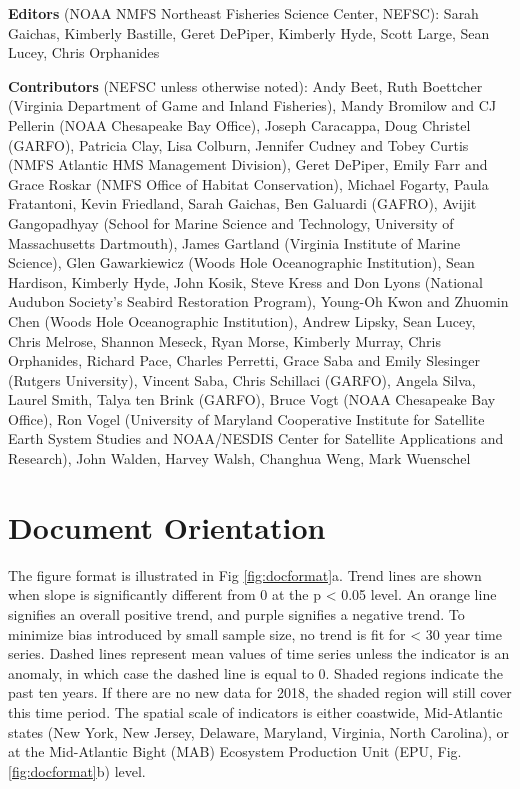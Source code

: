 \documentclass[
  10pt,
]{article}
\begin{document}
\textbf{Editors} (NOAA NMFS Northeast Fisheries Science Center, NEFSC):
Sarah Gaichas, Kimberly Bastille, Geret DePiper, Kimberly Hyde, Scott
Large, Sean Lucey, Chris Orphanides

\textbf{Contributors} (NEFSC unless otherwise noted): Andy Beet, Ruth
Boettcher (Virginia Department of Game and Inland Fisheries), Mandy
Bromilow and CJ Pellerin (NOAA Chesapeake Bay Office), Joseph Caracappa,
Doug Christel (GARFO), Patricia Clay, Lisa Colburn, Jennifer Cudney and
Tobey Curtis (NMFS Atlantic HMS Management Division), Geret DePiper,
Emily Farr and Grace Roskar (NMFS Office of Habitat Conservation),
Michael Fogarty, Paula Fratantoni, Kevin Friedland, Sarah Gaichas, Ben
Galuardi (GAFRO), Avijit Gangopadhyay (School for Marine Science and
Technology, University of Massachusetts Dartmouth), James Gartland
(Virginia Institute of Marine Science), Glen Gawarkiewicz (Woods Hole
Oceanographic Institution), Sean Hardison, Kimberly Hyde, John Kosik,
Steve Kress and Don Lyons (National Audubon Society's Seabird
Restoration Program), Young-Oh Kwon and Zhuomin Chen (Woods Hole
Oceanographic Institution), Andrew Lipsky, Sean Lucey, Chris Melrose,
Shannon Meseck, Ryan Morse, Kimberly Murray, Chris Orphanides, Richard
Pace, Charles Perretti, Grace Saba and Emily Slesinger (Rutgers
University), Vincent Saba, Chris Schillaci (GARFO), Angela Silva, Laurel
Smith, Talya ten Brink (GARFO), Bruce Vogt (NOAA Chesapeake Bay Office),
Ron Vogel (University of Maryland Cooperative Institute for Satellite
Earth System Studies and NOAA/NESDIS Center for Satellite Applications
and Research), John Walden, Harvey Walsh, Changhua Weng, Mark Wuenschel

\newpage

\hypertarget{document-orientation}{%
\section{Document Orientation}\label{document-orientation}}

The figure format is illustrated in Fig \ref{fig:docformat}a. Trend
lines are shown when slope is significantly different from 0 at the p
\textless{} 0.05 level. An orange line signifies an overall positive
trend, and purple signifies a negative trend. To minimize bias
introduced by small sample size, no trend is fit for \textless{} 30 year
time series. Dashed lines represent mean values of time series unless
the indicator is an anomaly, in which case the dashed line is equal to
0. Shaded regions indicate the past ten years. If there are no new data
for 2018, the shaded region will still cover this time period. The
spatial scale of indicators is either coastwide, Mid-Atlantic states
(New York, New Jersey, Delaware, Maryland, Virginia, North Carolina), or
at the Mid-Atlantic Bight (MAB) Ecosystem Production Unit (EPU, Fig.
\ref{fig:docformat}b) level.
\end{document}
